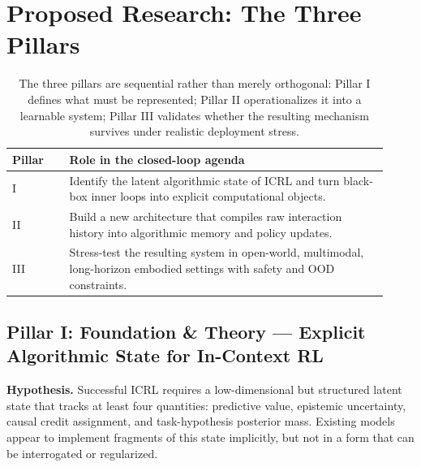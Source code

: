 \documentclass[10pt,twocolumn,letterpaper]{article}
\begin{document}
\section{Proposed Research: The Three Pillars}
\begin{table}[t]
\centering
\small
\begin{tabular}{p{0.14\linewidth}p{0.78\linewidth}}
\toprule
\textbf{Pillar} & \textbf{Role in the closed-loop agenda} \\
\midrule
I & Identify the latent algorithmic state of ICRL and turn black-box inner loops into explicit computational objects. \\
II & Build a new architecture that compiles raw interaction history into algorithmic memory and policy updates. \\
III & Stress-test the resulting system in open-world, multimodal, long-horizon embodied settings with safety and OOD constraints. \\
\bottomrule
\end{tabular}
\caption{The three pillars are sequential rather than merely orthogonal: Pillar I defines what must be represented; Pillar II operationalizes it into a learnable system; Pillar III validates whether the resulting mechanism survives under realistic deployment stress.}
\label{tab:pillars}
\end{table}

\subsection{Pillar I: Foundation \& Theory --- Explicit Algorithmic State for In-Context RL}
\textbf{Hypothesis.} Successful ICRL requires a low-dimensional but structured latent state that tracks at least four quantities: predictive value, epistemic uncertainty, causal credit assignment, and task-hypothesis posterior mass. Existing models appear to implement fragments of this state implicitly, but not in a form that can be interrogated or regularized.
\end{document}
